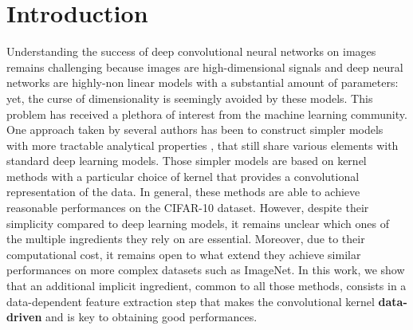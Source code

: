 \documentclass{article} %
\begin{document}
\section{Introduction}
Understanding the success of deep convolutional neural networks on images 
remains challenging because images are high-dimensional signals and deep neural networks are highly-non linear models  with a substantial amount of parameters: yet, the curse of dimensionality is seemingly avoided by these models. 
This problem has received a plethora of interest from the machine learning community. 
One approach taken by several authors \citep{mairal2016end,li2019enhanced,shankar2020neural,lu2014scale}  has been to construct simpler models  
with more tractable analytical properties \citep{jacot2018neural,rahimi2008random}, that still share various elements with standard deep learning models. Those simpler models are based on kernel methods with a particular choice of kernel that provides a convolutional representation of the data.
In general, these methods are able to achieve reasonable performances on the CIFAR-10 dataset. However, despite their simplicity compared to deep learning models, it remains unclear which ones of the multiple ingredients they rely on are essential.
Moreover, due to their computational cost, it remains open to what extend they achieve similar performances on more complex datasets such as ImageNet.
In this work, we show that an additional implicit ingredient, common to all those methods, consists in a data-dependent feature extraction step that makes the convolutional kernel \textbf{data-driven} and is key to obtaining good performances.
\end{document}
